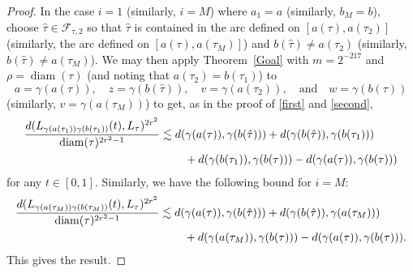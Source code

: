 \documentclass[11pt]{amsart}
\def\diam{{\rm diam\,}}
\theoremstyle{definition}
\def\diam{\operatorname{diam}}
\numberwithin{theorem}{section} \numberwithin{equation}{section}
\begin{document}
\begin{proof}
In the case $i=1$ (similarly, $i=M$)
where $a_1 = a$ (similarly, $b_M=b$),
choose $\hat{\tau} \in \mathcal{F}_{\tau,2}$ so that $\hat{\tau}$ is contained in the arc defined on $[a(\tau),a(\tau_2)]$ (similarly, the arc defined on $[a(\tau),a(\tau_M)]$)
and $b(\hat{\tau}) \neq a(\tau_2)$ (similarly, $b(\hat{\tau}) \neq a(\tau_M)$).
We may then apply Theorem~\ref{Goal} with $m = 2^{-217}$ and $\rho = \diam(\tau)$ (and noting that $a(\tau_2) = b(\tau_1)$) to 
$$
a = \gamma(a(\tau)), 
\quad
z = \gamma(b(\hat{\tau})),
\quad
v = \gamma(a(\tau_2)),
\quad 
\text{and}
\quad w = \gamma(b(\tau))
$$
(similarly, $v = \gamma(a(\tau_M))$)
to get, as in the proof of \eqref{first} and \eqref{second},
\begin{align*}
\frac{d(L_{\gamma(a(\tau_1))\gamma(b(\tau_1))}(t),L_{\tau})^{2r^2}}{\diam(\tau)^{2r^2 - 1}}
&\lesssim d(\gamma(a(\tau)), \gamma(b(\hat{\tau}))) + d(\gamma(b(\hat{\tau})), \gamma(b(\tau_1))) \\
&\hspace{.3in} + d(\gamma(b(\tau_1)), \gamma(b(\tau))) -  d(\gamma(a(\tau)), \gamma(b(\tau)))
\end{align*}
for any $t \in [0,1]$.
Similarly, we have the following bound for $i=M$:
\begin{align*}
\frac{d(L_{\gamma(a(\tau_M))\gamma(b(\tau_M))}(t),L_{\tau})^{2r^2}}{\diam(\tau)^{2r^2 - 1}}
&\lesssim d(\gamma(a(\tau)), \gamma(b(\hat{\tau}))) + d(\gamma(b(\hat{\tau})), \gamma(a(\tau_M)))\\
&\hspace{.3in} + d(\gamma(a(\tau_M)), \gamma(b(\tau))) -  d(\gamma(a(\tau)), \gamma(b(\tau))).
\end{align*}
This gives the result. 
\end{proof}
\end{document}
